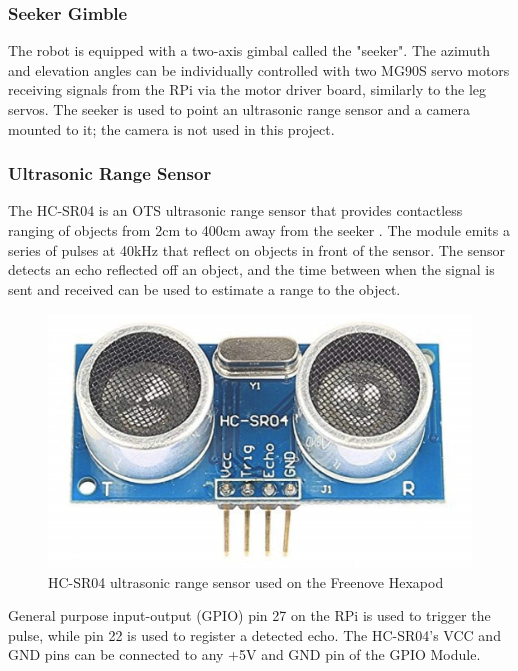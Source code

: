 \subsubsection{ Seeker Gimble }

The robot is equipped with a two-axis gimbal called the "seeker". The azimuth and elevation angles can be individually controlled with two MG90S servo motors receiving signals from the RPi via the motor driver board, similarly to the leg servos. The seeker is used to point an ultrasonic range sensor and a camera mounted to it; the camera is not used in this project.

\subsubsection{ Ultrasonic Range Sensor }

The HC-SR04 is an OTS ultrasonic range sensor that provides contactless ranging of objects from 2cm to 400cm away from the seeker \cite{hcsr04}.  The module emits a series of pulses at 40kHz that reflect on objects in front of the sensor. The sensor detects an echo reflected off an object, and the time between when the signal is sent and received can be used to estimate a range to the object. 

\begin{figure}[h]
    \centerline{\includegraphics[scale=0.12]{04_robot_system/figures/hc_sr04.png}}
    \caption{HC-SR04 ultrasonic range sensor used on the Freenove Hexapod}
    \label{fig:HC-SR04}
\end{figure}

General purpose input-output (GPIO) pin 27 on the RPi is used to trigger the pulse, while pin 22 is used to register a detected echo. The HC-SR04's VCC and GND pins can be connected to any +5V and GND pin of the GPIO Module.

